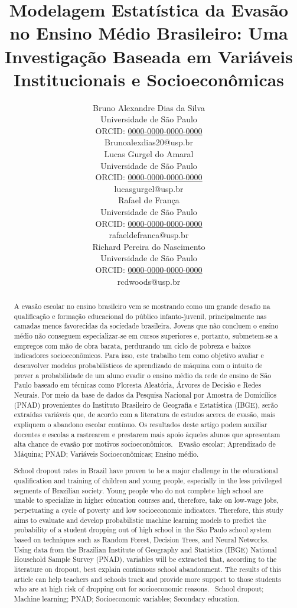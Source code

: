 \documentclass[english, spanish, brazilian]{RBIEarticle} %
\title{Modelagem Estatística da Evasão no Ensino Médio Brasileiro: Uma Investigação Baseada em Variáveis Institucionais e Socioeconômicas}
\author{%
	\parbox{3.8cm}{%
		Bruno Alexandre Dias da Silva\\
		Universidade de São Paulo\\
		ORCID: \href{https://orcid.org/0000-0000-0000-0000}{0000-0000-0000-0000}\\
		Brunoalexdias20@usp.br
	}
        \hspace{0.3cm}
	\parbox{3.8cm}{%
		Lucas Gurgel do Amaral\\
		Universidade de São Paulo\\
		ORCID: \href{https://orcid.org/0000-0000-0000-0000}{0000-0000-0000-0000}\\
		lucasgurgel@usp.br
	}
        \hspace{0.3cm}
        \parbox{3.8cm}{%
		Rafael de França\\
		Universidade de São Paulo\\
		ORCID: \href{https://orcid.org/0000-0000-0000-0000}{0000-0000-0000-0000}\\
		rafaeldefranca@usp.br
	}
        \hspace{0.3cm}
	\parbox{3.9cm}{\raggedright%
		Richard Pereira do Nascimento\\
		Universidade de São Paulo\\
		ORCID: \href{https://orcid.org/0000-0000-0000-0000}{0000-0000-0000-0000}\\
		rcdwoods@usp.br
	}
}
\begin{document}
\maketitle

\begin{otherlanguage}{brazilian}
\begin{abstract}
A evasão escolar no ensino brasileiro vem se mostrando como um grande desafio na qualificação e formação educacional do público infanto-juvenil, principalmente nas camadas menos favorecidas da sociedade brasileira. Jovens que não concluem o ensino médio não conseguem especializar-se em cursos superiores e, portanto, submetem-se a empregos com mão de obra barata, perdurando um ciclo de pobreza e baixos indicadores socioeconômicos. Para isso, este trabalho tem como objetivo avaliar e desenvolver modelos probabilísticos de aprendizado de máquina com o intuito de prever a probabilidade de um aluno evadir o ensino médio da rede de ensino de São Paulo baseado em técnicas como Floresta Aleatória, Árvores de Decisão e Redes Neurais. Por meio da base de dados da Pesquisa Nacional por Amostra de Domicílios (PNAD) provenientes do Instituto Brasileiro de Geografia e Estatística (IBGE), serão extraídas variáveis que, de acordo com a literatura de estudos acerca de evasão, mais expliquem o abandono escolar contínuo. Os resultados deste artigo podem auxiliar docentes e escolas a rastrearem e prestarem mais apoio àqueles alunos que apresentam alta chance de evasão por motivos socioeconômicos.  
\keywords\ Evasão escolar; Aprendizado de Máquina; PNAD; Variáveis Socioeconômicas; Ensino médio.
\end{abstract}
\end{otherlanguage}

\begin{otherlanguage}{english}
\begin{abstract}
School dropout rates in Brazil have proven to be a major challenge in the educational qualification and training of children and young people, especially in the less privileged segments of Brazilian society. Young people who do not complete high school are unable to specialize in higher education courses and, therefore, take on low-wage jobs, perpetuating a cycle of poverty and low socioeconomic indicators. Therefore, this study aims to evaluate and develop probabilistic machine learning models to predict the probability of a student dropping out of high school in the São Paulo school system based on techniques such as Random Forest, Decision Trees, and Neural Networks. Using data from the Brazilian Institute of Geography and Statistics (IBGE) National Household Sample Survey (PNAD), variables will be extracted that, according to the literature on dropout, best explain continuous school abandonment. The results of this article can help teachers and schools track and provide more support to those students who are at high risk of dropping out for socioeconomic reasons.
\keywords\ School dropout; Machine learning; PNAD; Socioeconomic variables; Secondary education.
\end{abstract}
\end{otherlanguage}
\end{document}
